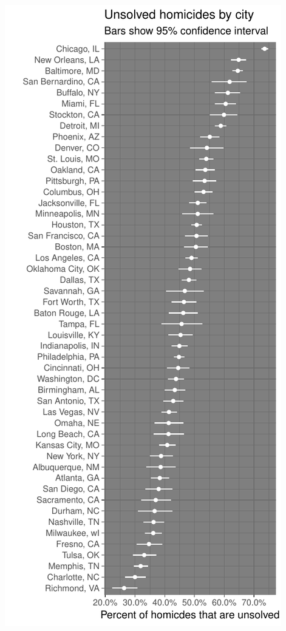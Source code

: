 \documentclass[]{article}
\begin{document}
\includegraphics{Hw4_files/figure-latex/unnamed-chunk-8-1.pdf}
\end{document}
